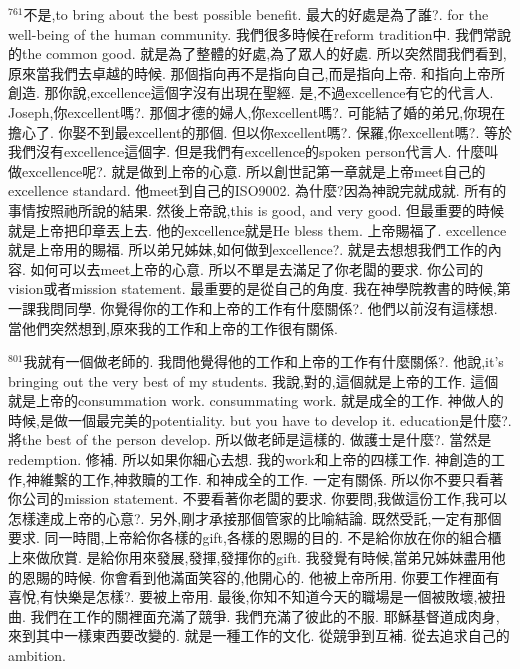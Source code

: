 \documentclass{book}
\begin{document}
$^{761}$不是,to bring about the best possible benefit.
最大的好處是為了誰?.
for the well-being of the human community.
我們很多時候在reform tradition中.
我們常說的the common good.
就是為了整體的好處,為了眾人的好處.
所以突然間我們看到,原來當我們去卓越的時候.
那個指向再不是指向自己,而是指向上帝.
和指向上帝所創造.
那你說,excellence這個字沒有出現在聖經.
是,不過excellence有它的代言人.
Joseph,你excellent嗎?.
那個才德的婦人,你excellent嗎?.
可能結了婚的弟兄,你現在擔心了.
你娶不到最excellent的那個.
但以你excellent嗎?.
保羅,你excellent嗎?.
等於我們沒有excellence這個字.
但是我們有excellence的spoken person代言人.
什麼叫做excellence呢?.
就是做到上帝的心意.
所以創世記第一章就是上帝meet自己的excellence standard.
他meet到自己的ISO9002.
為什麼?因為神說完就成就.
所有的事情按照祂所說的結果.
然後上帝說,this is good, and very good.
但最重要的時候就是上帝把印章丟上去.
他的excellence就是He bless them.
上帝賜福了.
excellence就是上帝用的賜福.
所以弟兄姊妹,如何做到excellence?.
就是去想想我們工作的內容.
如何可以去meet上帝的心意.
所以不單是去滿足了你老闆的要求.
你公司的vision或者mission statement.
最重要的是從自己的角度.
我在神學院教書的時候,第一課我問同學.
你覺得你的工作和上帝的工作有什麼關係?.
他們以前沒有這樣想.
當他們突然想到,原來我的工作和上帝的工作很有關係.

$^{801}$我就有一個做老師的.
我問他覺得他的工作和上帝的工作有什麼關係?.
他說,it's bringing out the very best of my students.
我說,對的,這個就是上帝的工作.
這個就是上帝的consummation work.
consummating work.
就是成全的工作.
神做人的時候,是做一個最完美的potentiality.
but you have to develop it.
education是什麼?.
將the best of the person develop.
所以做老師是這樣的.
做護士是什麼?.
當然是redemption.
修補.
所以如果你細心去想.
我的work和上帝的四樣工作.
神創造的工作,神維繫的工作,神救贖的工作.
和神成全的工作.
一定有關係.
所以你不要只看著你公司的mission statement.
不要看著你老闆的要求.
你要問,我做這份工作,我可以怎樣達成上帝的心意?.
另外,剛才承接那個管家的比喻結論.
既然受託,一定有那個要求.
同一時間,上帝給你各樣的gift,各樣的恩賜的目的.
不是給你放在你的組合櫃上來做欣賞.
是給你用來發展,發揮,發揮你的gift.
我發覺有時候,當弟兄姊妹盡用他的恩賜的時候.
你會看到他滿面笑容的,他開心的.
他被上帝所用.
你要工作裡面有喜悅,有快樂是怎樣?.
要被上帝用.
最後,你知不知道今天的職場是一個被敗壞,被扭曲.
我們在工作的關裡面充滿了競爭.
我們充滿了彼此的不服.
耶穌基督道成肉身,來到其中一樣東西要改變的.
就是一種工作的文化.
從競爭到互補.
從去追求自己的ambition.
\end{document}

